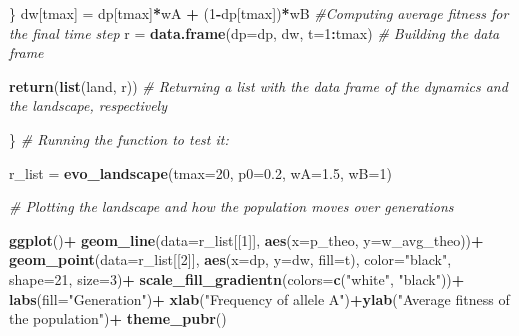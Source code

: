\documentclass[
]{book}
\newenvironment{Shaded}{\begin{snugshade}}{\end{snugshade}}
\newcommand{\AttributeTok}[1]{\textcolor[rgb]{0.13,0.29,0.53}{#1}}
\newcommand{\CommentTok}[1]{\textcolor[rgb]{0.56,0.35,0.01}{\textit{#1}}}
\newcommand{\DecValTok}[1]{\textcolor[rgb]{0.00,0.00,0.81}{#1}}
\newcommand{\FloatTok}[1]{\textcolor[rgb]{0.00,0.00,0.81}{#1}}
\newcommand{\FunctionTok}[1]{\textcolor[rgb]{0.13,0.29,0.53}{\textbf{#1}}}
\newcommand{\NormalTok}[1]{#1}
\newcommand{\OtherTok}[1]{\textcolor[rgb]{0.56,0.35,0.01}{#1}}
\newcommand{\SpecialCharTok}[1]{\textcolor[rgb]{0.81,0.36,0.00}{\textbf{#1}}}
\newcommand{\StringTok}[1]{\textcolor[rgb]{0.31,0.60,0.02}{#1}}
\begin{document}
\begin{Shaded}
\begin{Highlighting}[]
\NormalTok{\}}
\NormalTok{  dw[tmax] }\OtherTok{=}\NormalTok{  dp[tmax]}\SpecialCharTok{*}\NormalTok{wA }\SpecialCharTok{+}\NormalTok{ (}\DecValTok{1}\SpecialCharTok{{-}}\NormalTok{dp[tmax])}\SpecialCharTok{*}\NormalTok{wB }\CommentTok{\#Computing average fitness for the final time step}
\NormalTok{  r }\OtherTok{=} \FunctionTok{data.frame}\NormalTok{(}\AttributeTok{dp=}\NormalTok{dp, dw, }\AttributeTok{t=}\DecValTok{1}\SpecialCharTok{:}\NormalTok{tmax) }\CommentTok{\# Building the data frame}
  
  \FunctionTok{return}\NormalTok{(}\FunctionTok{list}\NormalTok{(land, r)) }\CommentTok{\# Returning a list with the data frame of the dynamics and the landscape, respectively}
  
\NormalTok{\}}
\CommentTok{\# Running the function to test it:}

\NormalTok{r\_list }\OtherTok{=} \FunctionTok{evo\_landscape}\NormalTok{(}\AttributeTok{tmax=}\DecValTok{20}\NormalTok{, }\AttributeTok{p0=}\FloatTok{0.2}\NormalTok{, }\AttributeTok{wA=}\FloatTok{1.5}\NormalTok{, }\AttributeTok{wB=}\DecValTok{1}\NormalTok{)}

\CommentTok{\# Plotting the landscape and how the population moves over generations}

\FunctionTok{ggplot}\NormalTok{()}\SpecialCharTok{+}
  \FunctionTok{geom\_line}\NormalTok{(}\AttributeTok{data=}\NormalTok{r\_list[[}\DecValTok{1}\NormalTok{]], }\FunctionTok{aes}\NormalTok{(}\AttributeTok{x=}\NormalTok{p\_theo, }\AttributeTok{y=}\NormalTok{w\_avg\_theo))}\SpecialCharTok{+}
  \FunctionTok{geom\_point}\NormalTok{(}\AttributeTok{data=}\NormalTok{r\_list[[}\DecValTok{2}\NormalTok{]], }\FunctionTok{aes}\NormalTok{(}\AttributeTok{x=}\NormalTok{dp, }\AttributeTok{y=}\NormalTok{dw, }\AttributeTok{fill=}\NormalTok{t), }\AttributeTok{color=}\StringTok{"black"}\NormalTok{, }\AttributeTok{shape=}\DecValTok{21}\NormalTok{, }\AttributeTok{size=}\DecValTok{3}\NormalTok{)}\SpecialCharTok{+}
  \FunctionTok{scale\_fill\_gradientn}\NormalTok{(}\AttributeTok{colors=}\FunctionTok{c}\NormalTok{(}\StringTok{"white"}\NormalTok{, }\StringTok{"black"}\NormalTok{))}\SpecialCharTok{+}
  \FunctionTok{labs}\NormalTok{(}\AttributeTok{fill=}\StringTok{"Generation"}\NormalTok{)}\SpecialCharTok{+}
  \FunctionTok{xlab}\NormalTok{(}\StringTok{"Frequency of allele A"}\NormalTok{)}\SpecialCharTok{+}\FunctionTok{ylab}\NormalTok{(}\StringTok{"Average fitness of the population"}\NormalTok{)}\SpecialCharTok{+}
  \FunctionTok{theme\_pubr}\NormalTok{()}
\end{Highlighting}
\end{Shaded}
\end{document}
